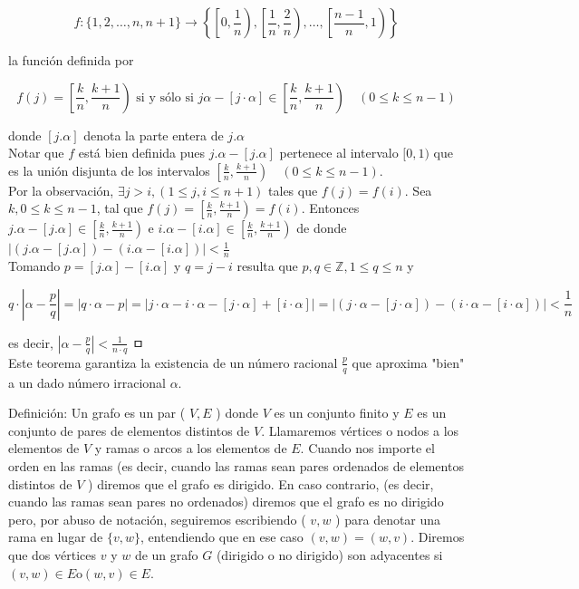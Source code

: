 \documentclass[10pt]{article}
\begin{document}
$$
f:\{1,2, \ldots, n, n+1\} \longrightarrow\left\{\left[0, \frac{1}{n}\right),\left[\frac{1}{n}, \frac{2}{n}\right), \ldots,\left[\frac{n-1}{n}, 1\right)\right\}
$$

la función definida por

$$
f(j)=\left[\frac{k}{n}, \frac{k+1}{n}\right) \text { si y sólo si } j \alpha-[j \cdot \alpha] \in\left[\frac{k}{n}, \frac{k+1}{n}\right) \quad(0 \leq k \leq n-1)
$$

donde $[j . \alpha]$ denota la parte entera de $j . \alpha$\\
Notar que $f$ está bien definida pues $j . \alpha-[j . \alpha]$ pertenece al intervalo $[0,1)$ que es la unión disjunta de los intervalos $\left[\frac{k}{n}, \frac{k+1}{n}\right) \quad(0 \leq k \leq n-1)$.\\
Por la observación, $\exists j>i,(1 \leq j, i \leq n+1)$ tales que $f(j)=f(i)$. Sea $k, 0 \leq k \leq n-1$, tal que $f(j)=\left[\frac{k}{n}, \frac{k+1}{n}\right)=f(i)$. Entonces $j . \alpha-[j . \alpha] \in\left[\frac{k}{n}, \frac{k+1}{n}\right)$ e $i . \alpha-[i . \alpha] \in\left[\frac{k}{n}, \frac{k+1}{n}\right)$ de donde $|(j . \alpha-[j . \alpha])-(i . \alpha-[i . \alpha])|<\frac{1}{n}$\\
Tomando $p=[j . \alpha]-[i . \alpha]$ y $q=j-i$ resulta que $p, q \in \mathbb{Z}, 1 \leq q \leq n$ y

$$
q \cdot\left|\alpha-\frac{p}{q}\right|=|q \cdot \alpha-p|=|j \cdot \alpha-i \cdot \alpha-[j \cdot \alpha]+[i \cdot \alpha]|=|(j \cdot \alpha-[j \cdot \alpha])-(i \cdot \alpha-[i \cdot \alpha])|<\frac{1}{n}
$$

es decir, $\left|\alpha-\frac{p}{q}\right|<\frac{1}{n \cdot q}$ ㅁ\\
Este teorema garantiza la existencia de un número racional $\frac{p}{q}$ que aproxima "bien" a un dado número irracional $\alpha$.

Definición: Un grafo es un par ( $V, E$ ) donde $V$ es un conjunto finito y $E$ es un conjunto de pares de elementos distintos de $V$. Llamaremos vértices o nodos a los elementos de $V$ y ramas o arcos a los elementos de $E$. Cuando nos importe el orden en las ramas (es decir, cuando las ramas sean pares ordenados de elementos distintos de $V$ ) diremos que el grafo es dirigido. En caso contrario, (es decir, cuando las ramas sean pares no ordenados) diremos que el grafo es no dirigido pero, por abuso de notación, seguiremos escribiendo ( $v, w$ ) para denotar una rama en lugar de $\{v, w\}$, entendiendo que en ese caso $(v, w)=(w, v)$. Diremos que dos vértices $v$ y $w$ de un grafo $G$ (dirigido o no dirigido) son adyacentes si $(v, w) \in E \mathrm{o}(w, v) \in E$.
\end{document}
